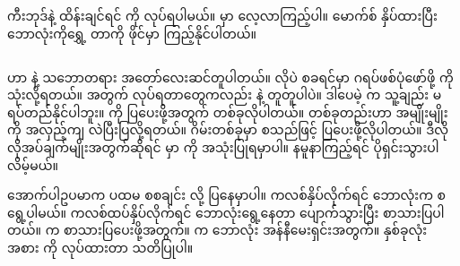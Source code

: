 ကီးဘုဒ်နဲ့ ထိန်းချင်ရင်  ကို  လုပ်ရပါမယ်။  မှာ လေ့လာကြည့်ပါ။ မောက်စ် နှိပ်ထားပြီး ဘောလုံးကိုရွှေ့  တာကို  ဖိုင်မှာ ကြည့်နိုင်ပါတယ်။


\subsection*{}
 ဟာ  နဲ့ သဘောတရား အတော်လေးဆင်တူပါတယ်။  လိုပဲ စခရင်မှာ ဂရပ်ဖစ်ပုံဖော်ဖို့  ကို သုံးလို့ရတယ်။  အတွက်  လုပ်ရတာတွေကလည်း  နဲ့ တူတူပါပဲ။ ဒါပေမဲ့  က သူ့ချည်း မရပ်တည်နိုင်ပါဘူး။  ကို ပြပေးဖို့အတွက်  တစ်ခုလိုပါတယ်။  တစ်ခုတည်းဟာ  အမျိုးမျိုးကို အလှည့်ကျ လဲပြီးပြလို့ရတယ်။ ဂိမ်းတစ်ခုမှာ  စသည်ဖြင့် ပြပေးဖို့လိုပါတယ်။ ဒီလို လိုအပ်ချက်မျိုးအတွက်ဆိုရင်  မှာ  ကို အသုံးပြုရမှာပါ။  နမူနာကြည့်ရင် ပိုရှင်းသွားပါလိမ့်မယ်။

အောက်ပါဥပမာက ပထမ စစချင်း  လို့ ပြနေမှာပါ။  ကလစ်နှိပ်လိုက်ရင် ဘောလုံးက စရွေ့ပါမယ်။ ကလစ်ထပ်နှိပ်လိုက်ရင် ဘောလုံးရွေ့နေတာ ပျောက်သွားပြီး  စာသားပြပါတယ်။  က စာသားပြပေးဖို့အတွက်။
 က ဘောလုံး အန်နီမေးရှင်းအတွက်။ နှစ်ခုလုံး  အစား  ကို  လုပ်ထားတာ သတိပြုပါ။


